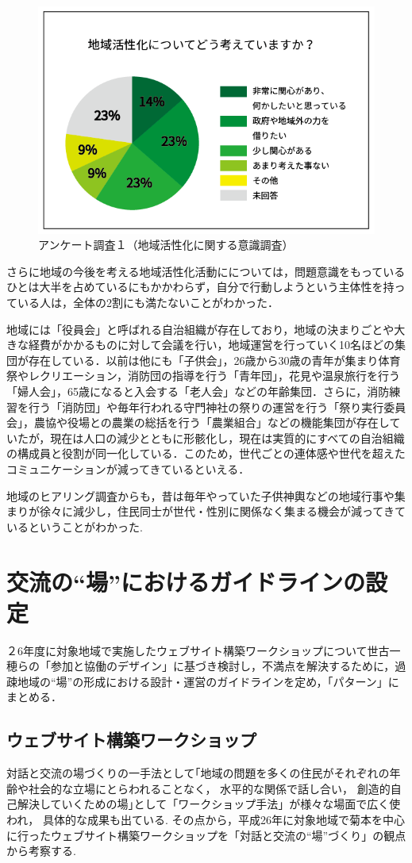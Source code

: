 \documentclass[a4paper]{jsarticle}
\begin{document}
\begin{figure}[H]
  \begin{center}
    \includegraphics[width=0.6\hsize]{./images/02.png}
    \caption{アンケート調査１（地域活性化に関する意識調査）}
    \label{fig:tmu_hino}
  \end{center}
\end{figure}

さらに地域の今後を考える地域活性化活動にについては，問題意識をもっているひとは大半を占めているにもかかわらず，自分で行動しようという主体性を持っている人は，全体の2割にも満たないことがわかった．\par
地域には「役員会」と呼ばれる自治組織が存在しており，地域の決まりごとや大きな経費がかかるものに対して会議を行い，地域運営を行っていく10名ほどの集団が存在している．以前は他にも「子供会」，26歳から30歳の青年が集まり体育祭やレクリエーション，消防団の指導を行う「青年団」，花見や温泉旅行を行う「婦人会」，65歳になると入会する「老人会」などの年齢集団．さらに，消防練習を行う「消防団」や毎年行われる守門神社の祭りの運営を行う「祭り実行委員会」，農協や役場との農業の総括を行う「農業組合」などの機能集団が存在していたが，現在は人口の減少とともに形骸化し，現在は実質的にすべての自治組織の構成員と役割が同一化している．このため，世代ごとの連体感や世代を超えたコミュニケーションが減ってきているといえる．\par
地域のヒアリング調査からも，昔は毎年やっていた子供神輿などの地域行事や集まりが徐々に減少し，住民同士が世代・性別に関係なく集まる機会が減ってきているということがわかった.

\newpage
\section{交流の“場”におけるガイドラインの設定}
２6年度に対象地域で実施したウェブサイト構築ワークショップについて世古一穂らの「参加と協働のデザイン」\cite{13}に基づき検討し，不満点を解決するために，過疎地域の“場”の形成における設計・運営のガイドラインを定め，「パターン」にまとめる．
\subsection{ウェブサイト構築ワークショップ}
対話と交流の場づくりの一手法として｢地域の問題を多くの住民がそれぞれの年齢や社会的な立場にとらわれることなく， 水平的な関係で話し合い， 創造的自己解決していくための場｣\cite{14}として「ワークショップ手法」が様々な場面で広く使われ， 具体的な成果も出ている. その点から，平成26年に対象地域で菊本\cite{15}を中心に行ったウェブサイト構築ワークショップを「対話と交流の“場”づくり」の観点から考察する.
\end{document}
